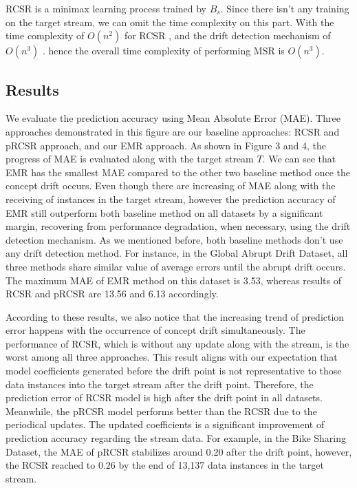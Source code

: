 \documentclass[conference,compsoc]{IEEEtran}
\begin{document}
RCSR is a minimax learning process trained by $B_s$. Since there isn't any training on the target stream, we can omit the time complexity on this part. With the time complexity of $O(n^2)$ for RCSR \cite{chen}, and the drift detection mechanism of $O(n^3)$ \cite{Haque1}. hence the overall time complexity of performing MSR is $O(n^3)$. 

\subsection{Results}

We evaluate the prediction accuracy using
Mean Absolute Error (MAE). Three approaches demonstrated in this figure are
our baseline approaches: RCSR and pRCSR approach, and our EMR approach. As shown in Figure 3 and 4, the progress of MAE is evaluated along with the target stream $T$. We can see that EMR has the smallest MAE compared to the other two baseline method once the concept drift occurs. Even though there are increasing of MAE along with the receiving of instances in the target stream, however the prediction accuracy of EMR still outperform both baseline method on all datasets by a significant margin, recovering from performance degradation, when necessary, using the drift detection mechanism. As we mentioned before, both baseline methods don't use any drift detection method. For instance, in the Global Abrupt Drift Dataset, all three methods share similar value of average errors until the abrupt drift occurs. The maximum MAE of EMR method on this dataset is 3.53, whereas results of RCSR and pRCSR are 13.56 and 6.13 accordingly.

According to these results, we also notice that the increasing trend of prediction error happens with the occurrence of concept drift simultaneously. The performance of RCSR, which is without any update along with the stream, is the worst among all three approaches. This result aligns with our expectation that model coefficients generated before the drift point is not representative to those data instances into the target stream after the drift point. Therefore, the prediction error of RCSR model is high after the drift point in all datasets. Meanwhile, the pRCSR model performs better than the RCSR due to the periodical updates. The updated coefficients is a significant improvement of prediction accuracy regarding the stream data. For example, in the Bike Sharing Dataset, the MAE of pRCSR stabilizes around 0.20 after the drift point, however, the RCSR reached to 0.26 by the end of 13,137 data instances in the target stream.
\end{document}

